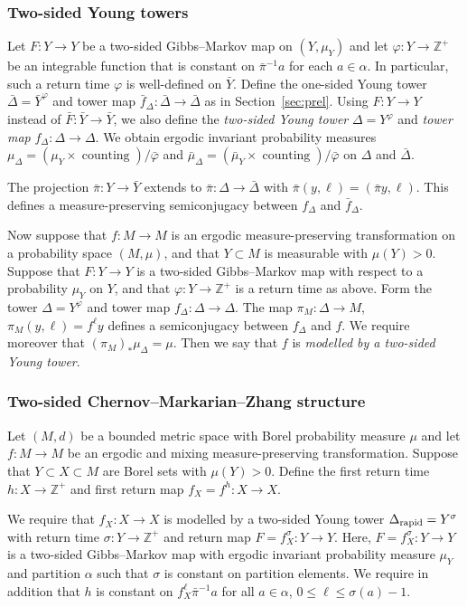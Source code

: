 \documentclass[10pt]{amsart}
\theoremstyle{definition}\newtheorem{defi}[theo]{Definition}\newtheorem{rema}[theo]{Remark}\newtheorem{exam}[theo]{Example}\newtheorem{exem}[theo]{Example}\newtheorem{nota}[theo]{Notation}
\newcommand{\Z}{\mathbb{Z}}
\DeclareMathOperator{\counting}{counting}
\newcommand{\DE}{\Delta_{\rm rapid}}
\newcommand{\bY}{\bar{Y}}
\newcommand{\bF}{\bar{F}}
\newcommand{\bvarphi}{\bar{\varphi}}
\begin{document}
\subsubsection*{Two-sided Young towers}
Let $F:Y\to Y$ be a two-sided Gibbs--Markov map on $(Y,\mu_Y)$ and let $\varphi:Y\to\Z^+$ be an integrable function that is constant on $\bar\pi^{-1}a$ for each $a\in\alpha$. In particular, such a return time $\varphi$ is well-defined on $\bY$. Define the one-sided Young tower $\bar\Delta=\bY^\varphi$ and tower map $\bar f_\Delta:\bar\Delta\to\bar\Delta$ as in Section~\ref{sec:prel}. Using $F:Y\to Y$ instead of $\bF:\bY\to\bY$, we also define the \emph{two-sided Young tower} $\Delta=Y^\varphi$ and \emph{tower map} $f_\Delta:\Delta\to\Delta$. We obtain ergodic invariant probability measures $\mu_\Delta=(\mu_Y\times\counting)/\bvarphi$ and $\bar\mu_\Delta=(\bar\mu_Y\times\counting)/\bvarphi$ on $\Delta$ and $\bar\Delta$.

The projection $\bar\pi:Y\to\bY$ extends to $\bar\pi:\Delta\to\bar\Delta$ with $\bar\pi(y,\ell)=(\bar\pi y,\ell)$. This defines a measure-preserving semiconjugacy between $f_\Delta$ and $\bar f_\Delta$.

Now suppose that $f:M\to M$ is an ergodic measure-preserving transformation on a probability space $(M,\mu)$, and that $Y\subset M$ is measurable with $\mu(Y)>0$. Suppose that $F:Y\to Y$ is a two-sided Gibbs--Markov map with respect to a probability $\mu_Y$ on $Y$, and that $\varphi:Y\to\Z^+$ is a return time as above. Form the tower $\Delta=Y^\varphi$ and tower map $f_\Delta:\Delta\to\Delta$. The map $\pi_M:\Delta\to M$, $\pi_M(y,\ell)=f^\ell y$ defines a semiconjugacy between $f_\Delta$ and $f$. We require moreover that $(\pi_M)_*\mu_\Delta=\mu$. Then we say that $f$ is \emph{modelled by a two-sided Young tower}.


\subsubsection*{Two-sided Chernov--Markarian--Zhang structure}
Let $(M,d)$ be a bounded metric space with Borel probability measure $\mu$ and let $f:M\to M$ be an ergodic and mixing measure-preserving transformation. Suppose that $Y\subset X\subset M$ are Borel sets with $\mu(Y)>0$. Define the first return time $h:X\to\Z^+$ and first return map $f_X=f^h:X\to X$.

We require that $f_X:X\to X$ is modelled by a two-sided Young tower $\DE=Y^\sigma$ with return time $\sigma:Y\to\Z^+$ and return map $F=f_X^\sigma:Y\to Y$. Here, $F=f_X^\sigma:Y\to Y$ is a two-sided Gibbs--Markov map with ergodic invariant probability measure $\mu_Y$ and partition $\alpha$ such that $\sigma$ is constant on partition elements. We require in addition that $h$ is constant on $f_X^\ell \bar\pi^{-1}a$ for all $a\in\alpha$, $0\le\ell\le\sigma(a)-1$.
\end{document}
